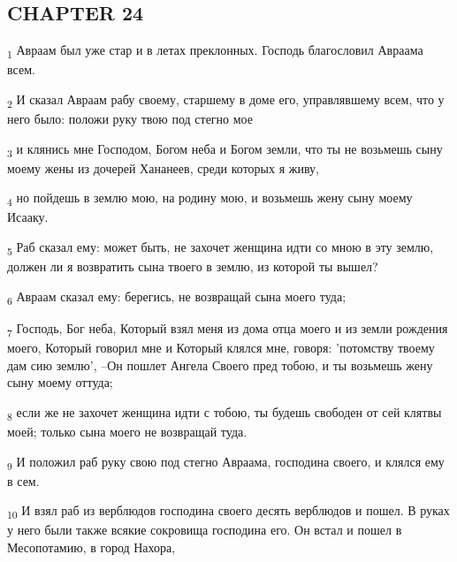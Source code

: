 \subsection{CHAPTER 24}
\begin{tcolorbox}
\textsubscript{1} Авраам был уже стар и в летах преклонных. Господь благословил Авраама всем.
\end{tcolorbox}
\begin{tcolorbox}
\textsubscript{2} И сказал Авраам рабу своему, старшему в доме его, управлявшему всем, что у него было: положи руку твою под стегно мое
\end{tcolorbox}
\begin{tcolorbox}
\textsubscript{3} и клянись мне Господом, Богом неба и Богом земли, что ты не возьмешь сыну моему жены из дочерей Хананеев, среди которых я живу,
\end{tcolorbox}
\begin{tcolorbox}
\textsubscript{4} но пойдешь в землю мою, на родину мою, и возьмешь жену сыну моему Исааку.
\end{tcolorbox}
\begin{tcolorbox}
\textsubscript{5} Раб сказал ему: может быть, не захочет женщина идти со мною в эту землю, должен ли я возвратить сына твоего в землю, из которой ты вышел?
\end{tcolorbox}
\begin{tcolorbox}
\textsubscript{6} Авраам сказал ему: берегись, не возвращай сына моего туда;
\end{tcolorbox}
\begin{tcolorbox}
\textsubscript{7} Господь, Бог неба, Который взял меня из дома отца моего и из земли рождения моего, Который говорил мне и Который клялся мне, говоря: 'потомству твоему дам сию землю', --Он пошлет Ангела Своего пред тобою, и ты возьмешь жену сыну моему оттуда;
\end{tcolorbox}
\begin{tcolorbox}
\textsubscript{8} если же не захочет женщина идти с тобою, ты будешь свободен от сей клятвы моей; только сына моего не возвращай туда.
\end{tcolorbox}
\begin{tcolorbox}
\textsubscript{9} И положил раб руку свою под стегно Авраама, господина своего, и клялся ему в сем.
\end{tcolorbox}
\begin{tcolorbox}
\textsubscript{10} И взял раб из верблюдов господина своего десять верблюдов и пошел. В руках у него были также всякие сокровища господина его. Он встал и пошел в Месопотамию, в город Нахора,
\end{tcolorbox}
